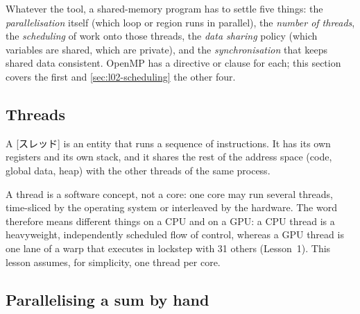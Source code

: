 \documentclass[../main.tex]{subfiles}
\begin{document}
Whatever the tool, a shared-memory program has to settle five things: the
\emph{parallelisation} itself (which loop or region runs in parallel), the
\emph{number of threads}, the \emph{scheduling} of work onto those threads,
the \emph{data sharing} policy (which variables are shared, which are
private), and the \emph{synchronisation} that keeps shared data
consistent.  OpenMP has a directive or clause for each; this section
covers the first and \cref{sec:l02-scheduling} the other four.

\subsection{Threads}

\begin{definition}[Thread]
  A [スレッド] is an entity that runs a sequence of
  instructions.  It has its own registers and its own stack, and it shares
  the rest of the address space (code, global data, heap) with the other
  threads of the same process.
\end{definition}

A thread is a software concept, not a core: one core may run several
threads, time-sliced by the operating system or interleaved by the
hardware.  The word therefore means
different things on a CPU and on a GPU: a CPU thread is a heavyweight,
independently scheduled flow of control, whereas a GPU thread is one lane of
a warp that executes in lockstep with 31 others (Lesson~1).  This lesson
assumes, for simplicity, one thread per core.

\subsection{Parallelising a sum by hand}
\end{document}
